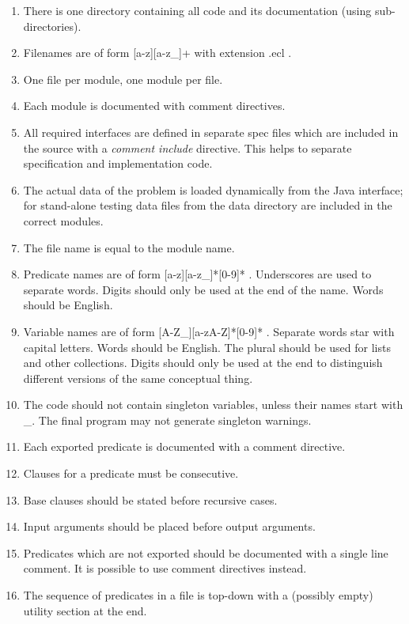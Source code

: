 \documentclass[a4paper,12pt]{report}
\begin{document}
\begin{enumerate}
\item   There is one directory containing all code and its documentation (using sub-directories).
\item  Filenames are of form [a-z][a-z\_]+ with extension .ecl .
\item  One file per module, one module per file.
\item  Each module is documented with comment directives.
\item  All required interfaces are defined in separate spec files which are included in the source with a {\it comment include} directive. This helps to separate specification and implementation code.
\item  The actual data of the problem is loaded dynamically from the Java interface; for stand-alone testing data files from the data directory are included in the correct modules.
\item  The file name is equal to the module name.
\item  Predicate names are of form [a-z][a-z\_]*[0-9]* . Underscores are used to separate words. Digits should only be used at the end of the name. Words should be English.
\item  Variable names are of form [A-Z\_][a-zA-Z]*[0-9]* . Separate words star with capital letters. Words should be English. The plural should be used for lists and other collections. Digits should only be used at the end to distinguish different versions of the same conceptual thing.
\item  The code should not contain singleton variables, unless their names start with \_. The final program may not generate singleton warnings.
\item  Each exported predicate is documented with a comment directive.
\item  Clauses for a predicate must be consecutive.
\item  Base clauses should be stated before recursive cases.
\item  Input arguments should be placed before output arguments.
\item  Predicates which are not exported should be documented with a single line comment. It is possible to use comment directives instead.
\item  The sequence of predicates in a file is top-down with a (possibly empty) utility section at the end.

\end{enumerate}
\end{document}
